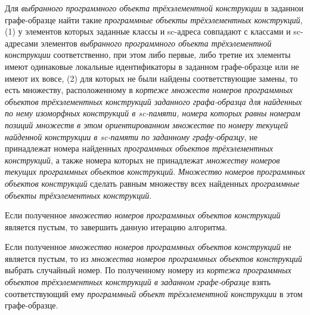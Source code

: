 \begin{textitemize}
	\item Для \textit{выбранного программного объекта трёхэлементной конструкции} в заданнои графе-образце найти  такие \textit{программные объекты трёхэлементных конструкций}, (1) у элементов которых заданные классы и sc-адреса совпадают с классами и sc-адресами элементов \textit{выбранного программного объекта трёхэлементной конструкции} соответственно, при этом либо первые, либо третие их элементы имеют одинаковые локальные идентификаторы в заданном графе-образце или не имеют их вовсе, (2) для которых не были найдены соответствующие замены, то есть множеству, расположенному в \textit{кортеже множеств номеров программных объектов трёхэлементных конструкций заданного графа-образца для найденных по нему изоморфных конструкций в sc-памяти, номера которых равны номерам позиций множеств в этом ориентированном множестве} по \textit{номеру текущей найденной конструкции в sc-памяти по заданному графу-образцу}, не принадлежат номера найденных \textit{программных объектов трёхэлементных конструкций}, а также номера которых не принадлежат \textit{множеству номеров текущих программных объектов конструкций}. \textit{Множество номеров  программных объектов конструкций} сделать равным множеству всех найденных \textit{программные объекты трёхэлементных конструкций}.
	\item Если полученное \textit{множество номеров  программных объектов конструкций} является пустым, то завершить данную итерацию алгоритма.
	\item Если полученное \textit{множество номеров  программных объектов конструкций} не является пустым, то из \textit{множества номеров  программных объектов конструкций} выбрать случайный номер. По полученному номеру из \textit{кортежа программных объектов трёхэлементных конструкций в заданном графе-образце} взять соответствующий ему \textit{программный объект трёхэлементной конструкции} в этом графе-образце.

\end{textitemize}
